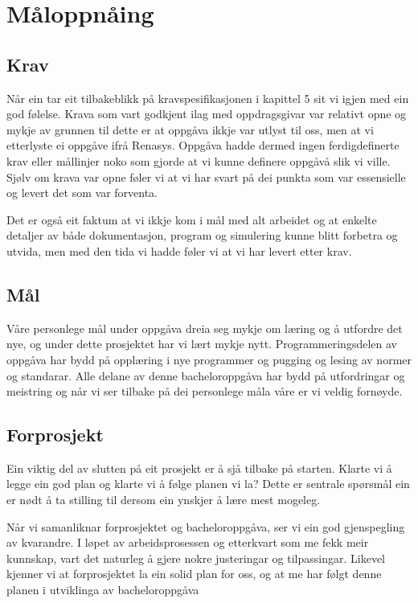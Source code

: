 \section{Måloppnåing}
\thispagestyle{fancy}

\subsection{Krav}
Når ein tar eit tilbakeblikk på kravspesifikasjonen i kapittel 5 sit vi igjen med ein god følelse.
Krava som vart godkjent ilag med oppdragsgivar var relativt opne og 
mykje av grunnen til dette er at oppgåva ikkje var utlyst til oss, men at vi etterlyste ei oppgåve ifrå Renasys.
Oppgåva hadde dermed ingen ferdigdefinerte krav eller mållinjer noko som gjorde at vi kunne definere oppgåvå slik vi ville.
Sjølv om krava var opne føler vi at vi har svart på dei punkta som var essensielle og levert det som var forventa.

Det er også eit faktum at vi ikkje kom i mål med alt arbeidet og at enkelte detaljer av både dokumentasjon, program og simulering
kunne blitt forbetra og utvida, men med den tida vi hadde føler vi at vi har levert etter krav.

\subsection{Mål}
Våre personlege mål under oppgåva dreia seg mykje om læring og å utfordre det nye, og under dette prosjektet har vi lært mykje nytt. 
Programmeringsdelen av oppgåva har bydd på opplæring i nye programmer og pugging og lesing av normer og standarar.
Alle delane av denne bacheloroppgåva har bydd på utfordringar og meistring og når vi ser tilbake på dei personlege måla våre er vi veldig fornøyde.

\subsection{Forprosjekt}
Ein viktig del av slutten på eit prosjekt er å sjå tilbake på starten.
Klarte vi å legge ein god plan og klarte vi å følge planen vi la?
Dette er sentrale spørsmål ein er nødt å ta stilling til dersom ein ynskjer å lære mest mogeleg.

Når vi samanliknar forprosjektet og bacheloroppgåva, ser vi ein god gjenspegling av kvarandre. 
I løpet av arbeidsprosessen og etterkvart som me fekk meir kunnskap, vart det naturleg å gjere nokre justeringar og tilpassingar. 
Likevel kjenner vi at forprosjektet la ein solid plan for oss, og at me har følgt denne planen i utviklinga av bacheloroppgåva


\newpage